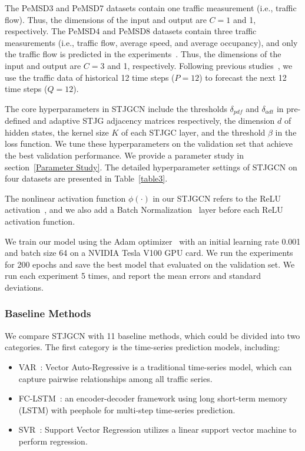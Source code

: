 \documentclass[10pt,journal,compsoc]{IEEEtran}
\begin{document}
The PeMSD3 and PeMSD7 datasets contain one traffic measurement (i.e., traffic flow). Thus, the dimensions of the input and output are $ C=1 $ and 1, respectively. The PeMSD4 and PeMSD8 datasets contain three traffic measurements (i.e., traffic flow, average speed, and average occupancy), and only the traffic flow is predicted in the experiments~\cite{Bai-et-al:NIPS2020,Chen-et-al:ICML2021}. Thus, the dimensions of the input and output are $ C=3 $ and 1, respectively. Following previous studies~\cite{Bai-et-al:NIPS2020,Chen-et-al:ICML2021}, we use the traffic data of historical 12 time steps ($ P = 12 $) to forecast the next 12 time steps ($ Q = 12 $). 

The core hyperparameters in STJGCN include the thresholds $ \delta_{pdf} $ and $ \delta_{adt} $ in pre-defined and adaptive STJG adjacency matrices respectively, the dimension $ d $ of hidden states, the kernel size $ K $ of each STJGC layer, and the threshold $ \beta $ in the loss function. We tune these hyperparameters on the validation set that achieve the best validation performance. We provide a parameter study in section~\ref{Parameter Study}. The detailed hyperparameter settings of STJGCN on four datasets are presented in Table~\ref{table3}.  

The nonlinear activation function $ \phi(\cdot) $ in our STJGCN refers to the ReLU activation~\cite{Nair-and-Hinton:ICML2010}, and we also add a Batch Normalization~\cite{Ioffe-and-Szegedy:NIPS2016} layer before each ReLU activation function. 

We train our model using the Adam optimizer~\cite{Kingma-and-Ba:ICLR2015} with an initial learning rate 0.001 and batch size 64 on a NVIDIA Tesla V100 GPU card. We run the experiments for 200 epochs and save the best model that evaluated on the validation set. We run each experiment 5 times, and report the mean errors and standard deviations.

\subsubsection{Baseline Methods}

We compare STJGCN with 11 baseline methods, which could be divided into two categories. The first category is the time-series prediction models, including:

\begin{itemize}
	\item VAR~\cite{VAR:1994}: Vector Auto-Regressive is a traditional time-series model, which can capture pairwise relationships among all traffic series.
	\item FC-LSTM~\cite{Sutskever-et-al:NIPS2014}: an encoder-decoder framework using long short-term memory (LSTM) with peephole for multi-step time-series prediction.
	\item SVR~\cite{Drucker-et-al:NIPS1997}: Support Vector Regression utilizes a linear support vector machine to perform regression.
\end{itemize}
\end{document}
